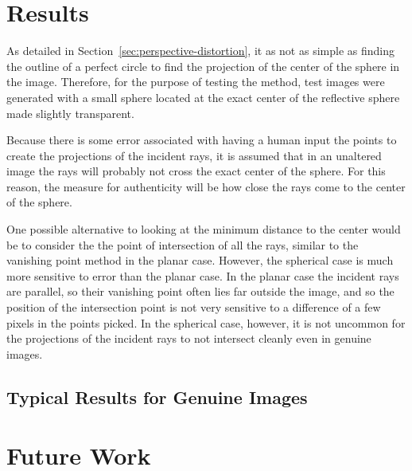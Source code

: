 \documentclass{thesis}
\begin{document}



\chapter{Results}
As detailed in Section~\ref{sec:perspective-distortion}, it as not as simple as finding the outline of a perfect circle to find the projection of the center of the sphere in the image. Therefore, for the purpose of testing the method, test images were generated with a small sphere located at the exact center of the reflective sphere made slightly transparent.

Because there is some error associated with having a human input the points to create the projections of the incident rays, it is assumed that in an unaltered image the rays will probably not cross the exact center of the sphere. For this reason, the measure for authenticity will be how close the rays come to the center of the sphere.

One possible alternative to looking at the minimum distance to the center would be to consider the the point of intersection of all the rays, similar to the vanishing point method in the planar case. However, the spherical case is much more sensitive to error than the planar case. In the planar case the incident rays are parallel, so their vanishing point often lies far outside the image, and so the position of the intersection point is not very sensitive to a difference of a few pixels in the points picked. In the spherical case, however, it is not uncommon for the projections of the incident rays to not intersect cleanly even in genuine images.

\section{Typical Results for Genuine Images}


\chapter{Future Work}

\clearpage

\appendix
%


\end{document}
